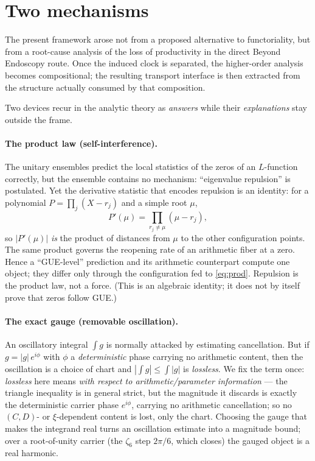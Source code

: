 \documentclass[11pt]{article}
\theoremstyle{definition}
\begin{document}
\tableofcontents

\section{Two mechanisms}\label{sec:two}

The present framework arose not from a proposed alternative to functoriality, but from a root-cause
analysis of the loss of productivity in the direct Beyond Endoscopy route. Once the induced clock is
separated, the higher-order analysis becomes compositional; the resulting transport interface is then
extracted from the structure actually consumed by that composition.

Two devices recur in the analytic theory as \emph{answers} while their \emph{explanations} stay
outside the frame.

\paragraph{The product law (self-interference).} The unitary ensembles predict the local statistics
of the zeros of an $L$-function correctly, but the ensemble contains no mechanism: ``eigenvalue repulsion'' is
postulated. Yet the derivative statistic that encodes repulsion is an identity: for a polynomial
$P=\prod_j(X-r_j)$ and a simple root $\mu$,
\begin{equation}\label{eq:prod}
  P'(\mu)=\prod_{r_j\neq\mu}(\mu-r_j),
\end{equation}
so $|P'(\mu)|$ \emph{is} the product of distances from $\mu$ to the other configuration points. The
same product governs the reopening rate of an arithmetic fiber at a zero. Hence a ``GUE-level''
prediction and its arithmetic counterpart compute one object; they differ only through the
configuration fed to \eqref{eq:prod}. Repulsion is the product law, not a force. (This is an
algebraic identity; it does not by itself prove that zeros follow GUE.)

\paragraph{The exact gauge (removable oscillation).} An oscillatory integral $\int g$ is normally
attacked by estimating cancellation. But if $g=|g|\,e^{i\phi}$ with $\phi$ a \emph{deterministic}
phase carrying no arithmetic content, then the oscillation is a choice of chart and
$|\int g|\le\int|g|$ is \emph{lossless}. We fix the term once: \emph{lossless} here means \emph{with
respect to arithmetic/parameter information} --- the triangle inequality is in general strict, but the
magnitude it discards is exactly the deterministic carrier phase $e^{i\phi}$, carrying no arithmetic
cancellation; so no $(C,D)$- or $\xi$-dependent content is lost, only the chart. Choosing the gauge that
makes the integrand real turns an oscillation estimate into a magnitude bound; over a root-of-unity
carrier (the $\zeta_6$ step $2\pi/6$, which closes) the gauged object is a real harmonic.
\end{document}
